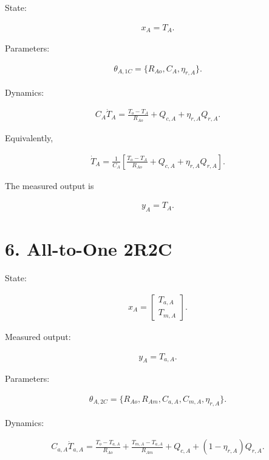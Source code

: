 \documentclass[11pt]{article}
\begin{document}
State:

\begin{align}
\boxed{x_A=T_A.}
\end{align}

Parameters:

\begin{align}
\boxed{
\theta_{A,1C}
=
\{R_{Ao},C_A,\eta_{r,A}\}.
}
\end{align}

Dynamics:

\begin{align}
\boxed{
C_A\dot T_A
=
\frac{T_o-T_A}{R_{Ao}}
+
Q_{c,A}
+
\eta_{r,A}Q_{r,A}.
}
\tag{14}
\end{align}

Equivalently,

\begin{align}
\dot T_A
=
\frac{1}{C_A}
\left[
\frac{T_o-T_A}{R_{Ao}}
+
Q_{c,A}
+
\eta_{r,A}Q_{r,A}
\right].
\tag{15}
\end{align}

The measured output is

\begin{align}
y_A=T_A.
\end{align}

\section*{6. All-to-One 2R2C}

State:

\begin{align}
\boxed{
x_A=
\begin{bmatrix}
T_{a,A}\\
T_{m,A}
\end{bmatrix}.
}
\end{align}

Measured output:

\begin{align}
y_A=T_{a,A}.
\end{align}

Parameters:

\begin{align}
\boxed{
\theta_{A,2C}
=
\{
R_{Ao},
R_{Am},
C_{a,A},
C_{m,A},
\eta_{r,A}
\}.
}
\end{align}

Dynamics:

\begin{align}
\boxed{
C_{a,A}\dot T_{a,A}
=
\frac{T_o-T_{a,A}}{R_{Ao}}
+
\frac{T_{m,A}-T_{a,A}}{R_{Am}}
+
Q_{c,A}
+
(1-\eta_{r,A})Q_{r,A}.
}
\tag{16}
\end{align}
\end{document}
